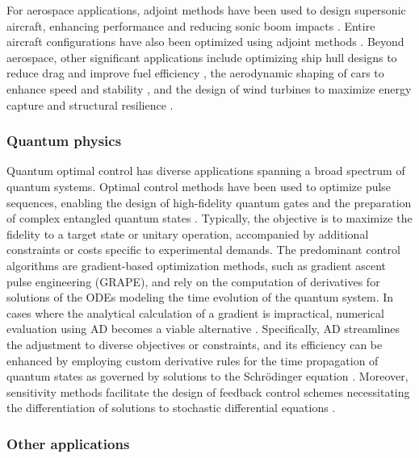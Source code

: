 For aerospace applications, adjoint methods have been used to design supersonic aircraft, enhancing performance and reducing sonic boom impacts \cite{hu2010supersonic,fike2013multi}. 
Entire aircraft configurations have also been optimized using adjoint methods \cite{chen2016aerodynamic}. 
Beyond aerospace, other significant applications include optimizing ship hull designs to reduce drag and improve fuel efficiency \cite{kroger2018ships}, the aerodynamic shaping of cars to enhance speed and stability \cite{Othmer2014caraerodynamics}, and the design of wind turbines to maximize energy capture and structural resilience \cite{dhert2017aerodynamic}.

\subsubsection{Quantum physics}

Quantum optimal control has diverse applications spanning a broad spectrum of quantum systems. 
Optimal control methods have been used to optimize pulse sequences, enabling the design of high-fidelity quantum gates and the preparation of complex entangled quantum states \cite{koch2022quantum}. 
Typically, the objective is to maximize the fidelity to a target state or unitary operation, accompanied by additional constraints or costs specific to experimental demands. 
The predominant control algorithms are gradient-based optimization methods, such as gradient ascent pulse engineering (GRAPE), and rely on the computation of derivatives for solutions of the ODEs modeling the time evolution of the quantum system. 
In cases where the analytical calculation of a gradient is impractical, numerical evaluation using AD becomes a viable alternative \cite{jirari:2009, leung:2017, abdelhafez:2019, jirari2019quantum, abdelhafez:2020, schaefer:2020, goerz:2022}. 
Specifically, AD streamlines the adjustment to diverse objectives or constraints, and its efficiency can be enhanced by employing custom derivative rules for the time propagation of quantum states as governed by solutions to the Schrödinger equation \cite{goerz:2022}. 
Moreover, sensitivity methods facilitate the design of feedback control schemes necessitating the differentiation of solutions to stochastic differential equations \cite{schaefer:2021}.

\subsubsection{Other applications}


